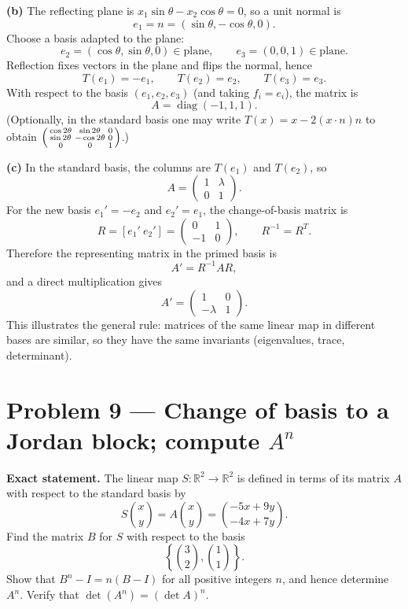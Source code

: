\documentclass[12pt,a4paper]{article}
\theoremstyle{plain}
\theoremstyle{definition}      %
\begin{document}
\textbf{(b)} The reflecting plane is $x_1\sin\theta-x_2\cos\theta=0$, so a unit normal is
\[
e_1=n=(\sin\theta,-\cos\theta,0).
\]
Choose a basis adapted to the plane:
\[
e_2=(\cos\theta,\sin\theta,0)\in \text{plane},\qquad e_3=(0,0,1)\in \text{plane}.
\]
Reflection fixes vectors in the plane and flips the normal, hence
\[
T(e_1)=-e_1,\qquad T(e_2)=e_2,\qquad T(e_3)=e_3.
\]
With respect to the basis $(e_1,e_2,e_3)$ (and taking $f_i=e_i$), the matrix is
\[
\boxed{A=\operatorname{diag}(-1,1,1).}
\]
(Optionally, in the standard basis one may write $T(x)=x-2(x\cdot n)n$ to obtain
$\begin{psmallmatrix}
	\cos 2\theta & \sin 2\theta & 0\\
	\sin 2\theta & -\cos 2\theta & 0\\
	0&0&1
\end{psmallmatrix}$.)


\textbf{(c)} In the standard basis, the columns are $T(e_1)$ and $T(e_2)$, so
\[
\boxed{
	A=\begin{pmatrix}
		1&\lambda\\
		0&1
	\end{pmatrix}.}
\]
For the new basis $e_1'=-e_2$ and $e_2'=e_1$, the change-of-basis matrix is
\[
R=[e_1'\ e_2']=\begin{pmatrix}0&1\\-1&0\end{pmatrix},
\qquad R^{-1}=R^T.
\]
Therefore the representing matrix in the primed basis is
\[
A'=R^{-1}AR,
\]
and a direct multiplication gives
\[
\boxed{
	A'=\begin{pmatrix}
		1&0\\
		-\lambda&1
	\end{pmatrix}.}
\]
This illustrates the general rule: matrices of the same linear map in different bases are similar, so they have the same invariants
(eigenvalues, trace, determinant).

\section*{Problem 9 — Change of basis to a Jordan block; compute $A^n$}

\textbf{Exact statement.}
The linear map $S:\mathbb R^2\to\mathbb R^2$ is defined in terms of its matrix $A$ with respect to the standard basis by
\[
S\binom{x}{y}=A\binom{x}{y}=\binom{-5x+9y}{-4x+7y}.
\]
Find the matrix $B$ for $S$ with respect to the basis
\[
\left\{\binom{3}{2},\binom{1}{1}\right\}.
\]
Show that $B^n-I = n(B-I)$ for all positive integers $n$, and hence determine $A^n$.
Verify that $\det(A^n)=(\det A)^n$.
\end{document}
